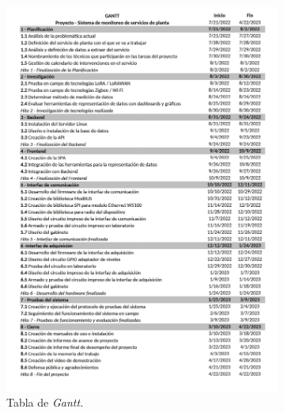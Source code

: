 \documentclass[
11pt%
]{charter}
\begin{document}


\begin{figure}[htpb]
\centering

\includegraphics[width=0.81\textwidth]{./Figuras/tablagantt3.pdf}

\caption{Tabla de \textit{Gantt.}}
\label{fig:gantt1}
\end{figure}
\end{document}
